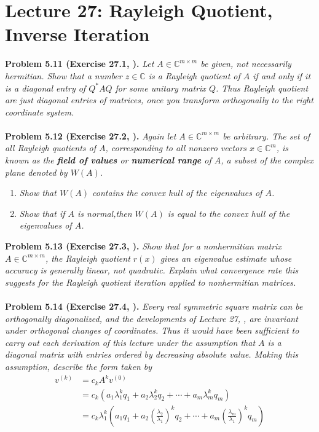 \documentclass[a4paper,oneside]{book}
\numberwithin{equation}{chapter}
\begin{document}
\section{Lecture 27: Rayleigh Quotient, Inverse Iteration}
\textbf{Problem 5.11 (Exercise 27.1, \cite{1}).} \textit{Let $A\in \mathbb{C}^{m\times m}$ be given, not necessarily hermitian. Show that a number $z\in \mathbb{C}$ is a Rayleigh quotient of $A$ if and only if it is a diagonal entry of $Q^* AQ$ for some unitary matrix $Q$. Thus Rayleigh quotient are just diagonal entries of matrices, once you transform orthogonally to the right coordinate system.}\\
\\
\textbf{Problem 5.12 (Exercise 27.2, \cite{1}).} \textit{Again let $A\in \mathbb{C}^{m\times m}$ be arbitrary. The set of all Rayleigh quotients of $A$, corresponding to all nonzero vectors $x\in \mathbb{C}^m$, is known as the \textbf{field of values} or \textbf{numerical range} of $A$, a subset of the complex plane denoted by $W\left(A\right)$.}
\begin{enumerate}
\item \textit{Show that $W\left(A\right)$ contains the convex hull of the eigenvalues of $A$.}
\item \textit{Show that if $A$ is normal,then $W\left(A\right)$ is equal to the convex hull of the eigenvalues of $A$.}
\end{enumerate}
\textbf{Problem 5.13 (Exercise 27.3, \cite{1}).} \textit{Show that for a nonhermitian matrix $A\in \mathbb{C}^{m\times m}$, the Rayleigh quotient $r\left(x\right)$ gives an eigenvalue estimate whose accuracy is generally linear, not quadratic. Explain what convergence rate this suggests for the Rayleigh quotient iteration applied to nonhermitian matrices.}\\
\\
\textbf{Problem 5.14 (Exercise 27.4, \cite{1}).} \textit{Every real symmetric square matrix can be orthogonally diagonalized, and the developments of Lecture 27, \cite{1}, are invariant under orthogonal changes of coordinates. Thus it would have been sufficient to carry out each derivation of this lecture under the assumption that $A$ is a diagonal matrix with entries ordered by decreasing absolute value. Making this assumption, describe the form taken by}
\begin{align}
{v^{\left( k \right)}} &= {c_k}{A^k}{v^{\left( 0 \right)}}\\
 &= {c_k}\left( {{a_1}\lambda _1^k{q_1} + {a_2}\lambda _2^k{q_2} +  \cdots  + {a_m}\lambda _m^k{q_m}} \right)\\
 &= {c_k}\lambda _1^k\left( {{a_1}{q_1} + {a_2}{{\left( {\frac{{{\lambda _2}}}{{{\lambda _1}}}} \right)}^k}{q_2} +  \cdots  + {a_m}{{\left( {\frac{{{\lambda _m}}}{{{\lambda _1}}}} \right)}^k}{q_m}} \right)
\end{align}
\end{document}
